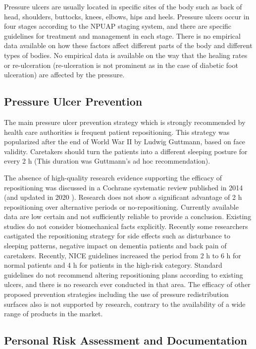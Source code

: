 Pressure ulcers are usually located in specific sites of the body such as back of head, shoulders, buttocks,  knees, elbows, hips and heels.  Pressure ulcers occur in four stages according to the NPUAP staging system, and there are specific guidelines for treatment and management in each stage.\cite{npuapguide} There is no empirical data available on how these factors affect different parts of the body and different types of bodies. No empirical data is available on the way that the healing rates or re-ulceration (re-ulceration is not prominent as in the case of diabetic foot ulceration) are affected by the pressure. 

\subsection{Pressure Ulcer Prevention}
The main pressure ulcer prevention strategy which is strongly recommended by health care authorities is frequent patient repositioning. This strategy was popularized after the end of World War II by Ludwig Guttmann, based on face validity. \cite{biomechanics} Caretakers should turn the patients into a different sleeping posture for every 2 h (This duration was Guttmann's ad hoc recommendation).

The absence of high-quality research evidence supporting the efficacy of repositioning was discussed in a Cochrane systematic review published in 2014  \cite{cochrane14} (and updated in 2020  \cite{cochrane20}). Research does not show a significant advantage of 2 h repositioning over alternative periods or no-repositioning. Currently available data are low certain and not sufficiently reliable to provide a conclusion. Existing studies do not consider biomechanical facts explicitly. Recently some researchers castigated the repositioning strategy for side effects such as disturbance to sleeping patterns, negative impact on dementia patients and back pain of caretakers.\cite{elderabuse} Recently, NICE guidelines increased the period from 2 h to 6 h for normal patients and 4 h for patients in the high-risk category. \cite{sara} Standard guidelines do not recommend altering repositioning plans according to existing ulcers, and there is no research ever conducted in that area. The efficacy of other proposed prevention strategies including the use of pressure redistribution surfaces also is not supported by research, contrary to the availability of a wide range of products in the market. \cite{cochranesupport}

\subsection{Personal Risk Assessment and Documentation}

